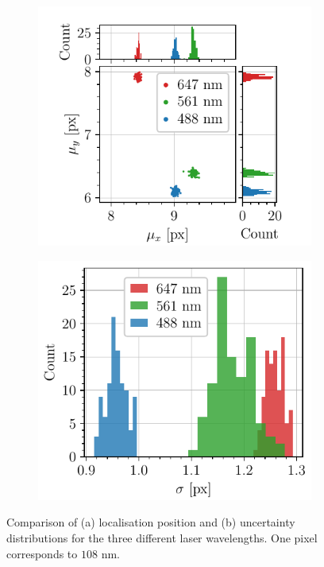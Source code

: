 \begin{figure}[htbp]
    \begin{subfigure}{0.49\textwidth}
        \centering
        {\includegraphics[scale=1]{figures/comparison_mu.pdf}}
        \caption{}
        \label{fig:comparison_mu}
    \end{subfigure}
    \begin{subfigure}{0.49\textwidth}
        \centering
        {\includegraphics[scale=1]{figures/comparison_sigma.pdf}}
        \caption{}
        \label{fig:comparison_sigma}
    \end{subfigure}
    \caption{Comparison of (a) localisation position and (b) uncertainty distributions for the three different laser wavelengths. One pixel corresponds to $108$ nm.}
    \label{fig:comparison_wavelengths}
\end{figure}
